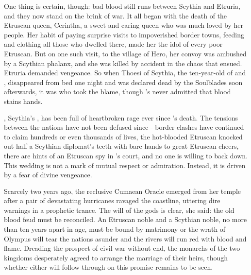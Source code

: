 \documentclass[blue]{Kos}
\begin{document}
One thing is certain, though: bad blood still runs between Scythia and Etruria, and they now stand on the brink of war. It all began with the death of the Etruscan queen, Cerintha, a sweet and caring queen who was much-loved by her people. Her habit of paying surprise visits to impoverished border towns, feeding and clothing all those who dwelled there, made her the idol of every poor Etruscan. But on one such visit, to the village of Hero, her convoy was ambushed by a Scythian phalanx, and she was killed by accident in the chaos that ensued. Etruria demanded vengeance. So when \cFugitive{\Prince} Thoesi of Scythia, the ten-year-old \cFugitive{\offspring} of \cScythiaKing{\Monarch} \cScythiaKing{} and \cScythiaQueen{\Monarch} \cScythiaQueen{}, disappeared from \cFugitive{\their} bed one night and was declared dead by the Soulblades soon afterwards, it was \cEtruriaKing{} who took the blame, though \cEtruriaKing{\they}’s never admitted that \cFugitive{\their} blood stains \cEtruriaKing{\their} hands.

\cScythiaQueen{}, Scythia's \cScythiaQueen{\monarch}, has been full of heartbroken rage ever since \cScythiaQueen{\their} \cFugitive{\offspring}'s death. The tensions between the nations have not been defused since - border clashes have continued to claim hundreds or even thousands of lives, the hot-blooded Etruscan \cPoet{\prince} \cPoet{} knocked out half a Scythian diplomat's teeth with \cPoet{\their} bare hands to great Etruscan cheers, there are hints of an Etruscan spy in \cScythiaKing{\Monarch} \cScythiaKing{}'s court, and no one is willing to back down. This wedding is not a mark of mutual respect or admiration. Instead, it is driven by a fear of divine vengeance.

Scarcely two years ago, the reclusive Cumaean Oracle emerged from her temple after a pair of devastating hurricanes ravaged the coastline, uttering dire warnings in a prophetic trance. The will of the gods is clear, she said: the old blood feud must be reconciled. An Etruscan noble and a Scythian noble, no more than ten years apart in age, must be bound by matrimony or the wrath of Olympus will tear the nations asunder and the rivers will run red with blood and flame. Dreading the prospect of civil war without end, the monarchs of the two kingdoms desperately agreed to arrange the marriage of their heirs, though whether either will follow through on this promise remains to be seen.
\end{document}
